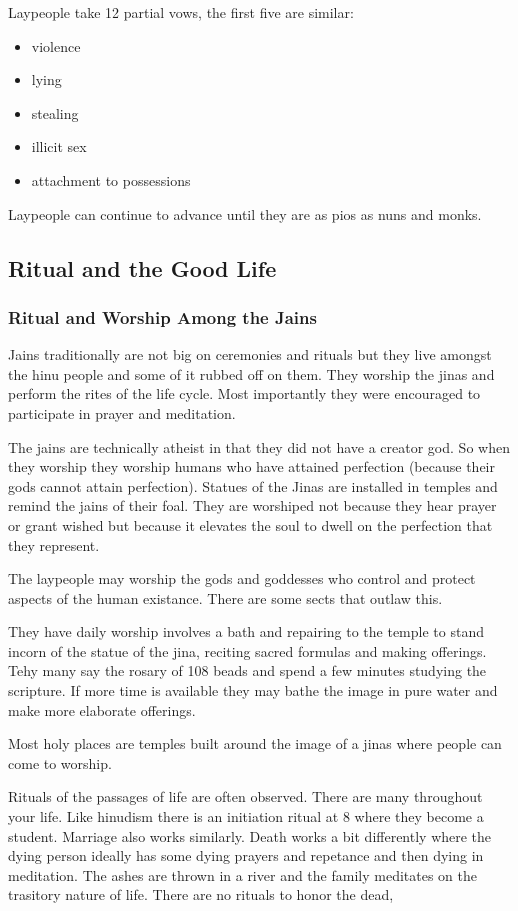 \documentclass{article}
\begin{document}
Laypeople take 12 partial vows, the first five are similar:
\begin{itemize}
	\item violence
	\item lying
	\item stealing
	\item illicit sex
	\item attachment to possessions
\end{itemize}
Laypeople can continue to advance until they are as pios as nuns and monks.

\subsection{Ritual and the Good Life}
\label{sub:ritual_and_the_good_life}
\subsubsection{Ritual and Worship Among the Jains}
\label{ssub:ritual_and_worship_among_the_jains}
Jains traditionally are not big on ceremonies and rituals but they live amongst the hinu people and some of it rubbed off on them. They worship the jinas and perform the rites of the life cycle. Most importantly they were encouraged to participate in prayer and meditation.

The jains are technically atheist  in that they did not have a creator god. So when they worship they worship humans who have attained perfection (because their gods cannot attain perfection). Statues of the Jinas are installed in temples and remind the jains of their foal. They are worshiped not because they hear prayer or grant wished but because it elevates the soul to dwell on the perfection that they represent.

The laypeople may worship the gods and goddesses who control and protect aspects of the human existance. There are some sects that outlaw this.

They have daily worship involves a bath and repairing to the temple to stand incorn of the statue of the jina, reciting sacred formulas and making offerings. Tehy many say the rosary of 108 beads and spend a few minutes studying the scripture. If more time is available they may bathe the image in pure water and make more elaborate offerings.

Most holy places are temples built around the image of a jinas where people can come to worship.

Rituals of the passages of life are often observed. There are many throughout your life. Like hinudism there is an initiation ritual at 8 where they become a student. Marriage also works similarly. Death works a bit differently where the dying person ideally has some dying prayers and repetance and then dying in meditation. The ashes are thrown in a river and the family meditates on the trasitory nature of life. There are no rituals to honor the dead,
\end{document}
